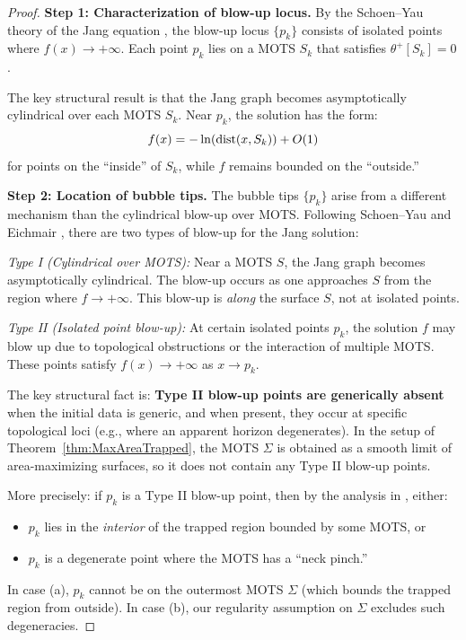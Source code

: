 \begin{proof}
\textbf{Step 1: Characterization of blow-up locus.}
By the Schoen--Yau theory of the Jang equation \cite{schoenyau1981}, the blow-up locus $\{p_k\}$ consists of isolated points where $f(x) \to +\infty$. Each point $p_k$ lies on a MOTS $S_k$ that satisfies $\theta^+[S_k] = 0$.

The key structural result is that the Jang graph becomes asymptotically cylindrical over each MOTS $S_k$. Near $p_k$, the solution has the form:
\[
    f(x) = -\ln(\mathrm{dist}(x, S_k)) + O(1)
\]
for points on the ``inside'' of $S_k$, while $f$ remains bounded on the ``outside.''

\textbf{Step 2: Location of bubble tips.}
The bubble tips $\{p_k\}$ arise from a different mechanism than the cylindrical blow-up over MOTS. Following Schoen--Yau \cite{schoenyau1981} and Eichmair \cite{eichmair2009}, there are two types of blow-up for the Jang solution:

\emph{Type I (Cylindrical over MOTS):} Near a MOTS $S$, the Jang graph becomes asymptotically cylindrical. The blow-up occurs as one approaches $S$ from the region where $f \to +\infty$. This blow-up is \emph{along} the surface $S$, not at isolated points.

\emph{Type II (Isolated point blow-up):} At certain isolated points $p_k$, the solution $f$ may blow up due to topological obstructions or the interaction of multiple MOTS. These points satisfy $f(x) \to +\infty$ as $x \to p_k$.

The key structural fact is: \textbf{Type II blow-up points are generically absent} when the initial data is generic, and when present, they occur at specific topological loci (e.g., where an apparent horizon degenerates). In the setup of Theorem~\ref{thm:MaxAreaTrapped}, the MOTS $\Sigma$ is obtained as a smooth limit of area-maximizing surfaces, so it does not contain any Type II blow-up points.

More precisely: if $p_k$ is a Type II blow-up point, then by the analysis in \cite{eichmair2009}, either:
\begin{itemize}
    \item[(a)] $p_k$ lies in the \emph{interior} of the trapped region bounded by some MOTS, or
    \item[(b)] $p_k$ is a degenerate point where the MOTS has a ``neck pinch.''
\end{itemize}
In case (a), $p_k$ cannot be on the outermost MOTS $\Sigma$ (which bounds the trapped region from outside). In case (b), our regularity assumption on $\Sigma$ excludes such degeneracies.


\end{proof}

